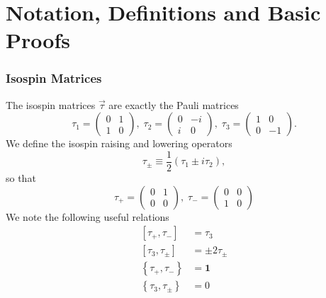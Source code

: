 \documentclass{book}[12pt]
\begin{document}



\appendix
\chapter{Notation, Definitions and Basic Proofs}
\subsection{Isospin Matrices}
The isospin matrices $\vec{\tau}$ are exactly the Pauli matrices
\begin{equation}
\tau_1=\left(\begin{array}{cc}
0 & 1\\
1 & 0
\end{array}\right),\;
\tau_2=\left(\begin{array}{cc}
0 & -i\\
i & 0
\end{array}\right),\;
\tau_3=\left(\begin{array}{cc}
1 & 0\\
0 & -1
\end{array}\right).
\end{equation}
We define the isospin raising and lowering operators
\begin{equation}
\tau_{\pm}\equiv \frac{1}{2}\left(\tau_1\pm i \tau_2\right),
\end{equation}
so that
\begin{equation}
\tau_+=\left(\begin{array}{cc}
0 & 1\\
0 & 0
\end{array}\right),\;\tau_- = \left(\begin{array}{cc}
0 & 0\\
1 & 0
\end{array}\right)
\end{equation}
We note the following useful relations
\begin{equation}
\begin{split}
\left[\tau_+,\tau_-\right]&=\tau_3\\
\left[\tau_3,\tau_{\pm}\right]&=\pm 2\tau_{\pm}\\
\left\{\tau_+,\tau_-\right\}&=\mathbf{1}\\
\left\{\tau_3,\tau_{\pm}\right\}&=0
\end{split}
\end{equation}
\end{document}
